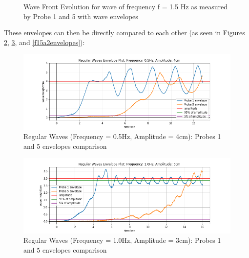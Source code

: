 \documentclass{article}
\begin{document}
	\vspace{-.5cm}
	\begin{figure}[H]
		\centering
		\caption{Wave Front Evolution for wave of frequency f = 1.5 Hz as measured by Probe 1 and 5 with wave envelopes}
		\label{wave3envelope}
	\end{figure}
	These envelopes can then be directly compared to each other (as seen in Figures \ref{f05a4envelopes}, \ref{f10a3envelopes}, and \ref{f15a2envelopes}):\\
	\begin{figure}[H]
		\centering
		\includegraphics[clip, trim = {1cm 0.1cm 1cm 0.5cm},width=\textwidth]{../graphs/F05A4Probes1and5Envelope.png}
		\caption{Regular Waves (Frequency = 0.5Hz, Amplitude = 4cm): Probes 1 and 5 envelopes comparison}
		\label{f05a4envelopes}
	\end{figure}
	\vspace{-.5cm}
	\begin{figure}[H]
		\centering
		\includegraphics[clip, trim = {1cm 0.1cm 1cm 0.5cm},width=\textwidth]{../graphs/F10A3Probes1and5Envelope.png}
		\caption{Regular Waves (Frequency = 1.0Hz, Amplitude = 3cm): Probes 1 and 5 envelopes comparison}
		\label{f10a3envelopes}
	\end{figure}
\end{document}
